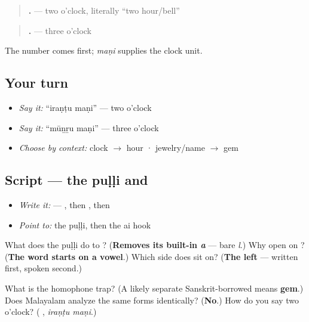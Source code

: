\begin{grammarlens}[title={Grammar Lens: Tell the time}]
\begin{quote}
\textbf{ .} — two o'clock, literally \textquotedblleft{}two hour/bell\textquotedblright{}
\end{quote}

\begin{quote}
\textbf{ .} — three o'clock
\end{quote}

The number comes first; \emph{maṇi} supplies the clock unit.
\end{grammarlens}

\subsection*{Your turn}
\begin{itemize}
\raggedright
  \item \emph{Say it:} \textquotedblleft{}iraṇṭu maṇi\textquotedblright{} — two o'clock
  \item \emph{Say it:} \textquotedblleft{}mūṉṟu maṇi\textquotedblright{} — three o'clock
  \item \emph{Choose by context:} clock $\to$ hour · jewelry/name $\to$ gem
\end{itemize}

\subsection*{Script — the puḷḷi and }
\begin{itemize}
\raggedright
  \item \emph{Write it:} \textbf{} — \textbf{}, then \textbf{}, then \textbf{}
  \item \emph{Point to:} the puḷḷi, then the ai hook
\end{itemize}

What does the puḷḷi do to \textbf{}? (\textbf{Removes its built-in \emph{a}} — bare \emph{l}.) Why open on \textbf{}? (\textbf{The word starts on a vowel}.) Which side does \textbf{} sit on? (\textbf{The left} — written first, spoken second.)

\begin{tcolorbox}[breakable,colback=teal!4,colframe=teal!35!black,title={Before you move on}]
What is the homophone trap? (A likely separate Sanskrit-borrowed \textbf{} means \textbf{gem}.) Does Malayalam analyze the same forms identically? (\textbf{No}.) How do you say two o'clock? (\textbf{ }, \emph{iraṇṭu maṇi}.)
\end{tcolorbox}
